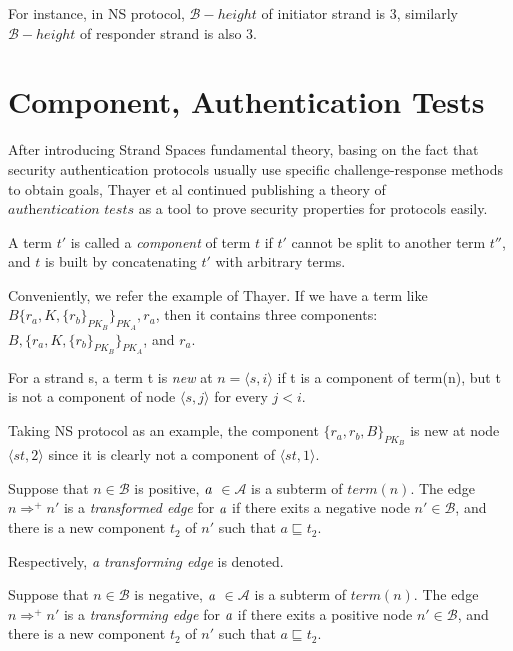 For instance, in NS protocol, $\mathcal{B}-height$ of initiator strand is 3, similarly $\mathcal{B}-height$ of responder strand is also 3.

\section{Component, Authentication Tests}

After introducing Strand Spaces fundamental theory, basing on the fact that security authentication protocols usually use specific challenge-response methods to obtain goals, Thayer et al\cite{authenticationtests} continued publishing a theory of $\textit{authentication tests}$ as a tool to prove security properties for protocols easily. 

\begin{Definition}
 A term $t'$ is called a \emph{component} of term $t$ if $t'$ cannot be split to another term $t''$, and $t$ is built by concatenating $t'$ with arbitrary terms.
\end{Definition}

Conveniently, we refer the example of Thayer\cite{Thayer:2010aa}. If we have a term like $B\{r_a,K,\{r_b\}_{PK_B}\}_{PK_A},r_a$, then it contains three components: $B, \{r_a,K,\{r_b\}_{PK_B}\}_{PK_A}$, and $r_a$. 
 
\begin{Definition}
 For a strand s, a term t is \emph{new} at $n = \langle s,i\rangle$ if t is a component of term(n), but t is not a component of node $\langle s,j\rangle$ for every $j<i$. 
\end{Definition}

Taking NS protocol as an example, the component $\{r_a,r_b,B\}_{PK_B}$ is new at node $\langle st,2 \rangle$ since it is clearly not a component of $\langle st,1 \rangle$. 

\begin{Definition} Suppose that $n \in \mathcal{B}$ is positive, $\emph{a}$ $\in \mathcal{A}$ is a subterm of $term(n)$. The edge $n \Rightarrow^+ n'$ is a \emph{transformed edge} for $\emph{a}$ if there exits a negative node $n' \in \mathcal{B}$, and there is a new component $t_2$ of $n'$ such that $a \sqsubseteq t_2$.
\end{Definition}

Respectively, \textit{a transforming edge} is denoted.

\begin{Definition} Suppose that $n \in \mathcal{B}$ is negative, $\emph{a}$ $\in \mathcal{A}$ is a subterm of $term(n)$. The edge $n \Rightarrow^+ n'$ is a \emph{transforming edge} for $\emph{a}$ if there exits a positive node $n' \in \mathcal{B}$, and there is a new component $t_2$ of $n'$ such that $a \sqsubseteq t_2$.
\end{Definition}

